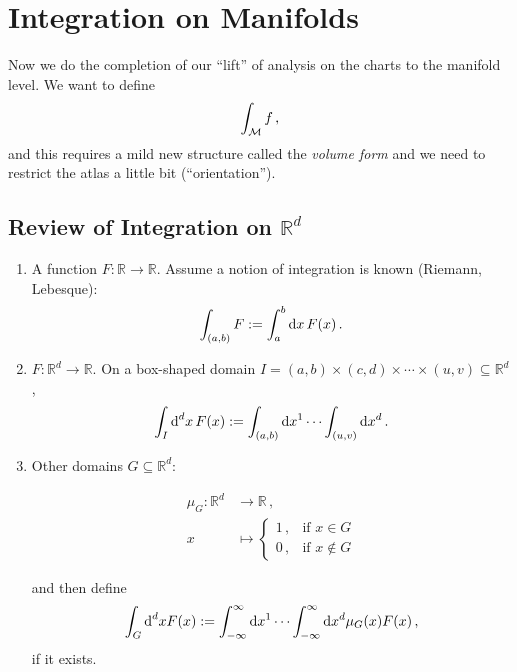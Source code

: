 \section{Integration on Manifolds}
Now we do the completion of our ``lift'' of analysis on the charts to the manifold level.
We want to define
\begin{equation}
    \int_{\mathcal{M}} f\,,
\end{equation}
and this requires a mild new structure called the \textit{volume form}
and we need to restrict the atlas a little bit (``orientation'').

\subsection[Review of Integration]{Review of Integration on $\mathbb{R}^d$}
\begin{enumerate}
    \item A function $F: \mathbb{R} \to \mathbb{R}$. Assume a notion of integration is known
        (Riemann, Lebesque):
        \begin{equation}
            \int_{(a,b)}F := \int_a^b \operatorname{d\!} x\, F(x)\,.
        \end{equation}
    \item $F: \mathbb{R}^d \to \mathbb{R}$.
        On a box-shaped domain
        $I = (a,b)\times(c,d)\times\cdots\times (u,v) \subseteq \mathbb{R}^d$,
        \begin{equation}
            \int_{I} \operatorname{d}^d\! x\, F(x) := \int_{(a,b)}\operatorname{d\!} x^1 \cdots \int_{(u,v)}\operatorname{d\!} x^d\,.
        \end{equation}
    \item Other domains $G\subseteq \mathbb{R}^d$:
        \begin{defn}
            \begin{align}
                \nonumber \mu_G: \mathbb{R}^d &\to \mathbb{R}\,,\\
                x&\mapsto
                \begin{cases}
                    1\,, & \text{if } x\in G\\
                    0\,, & \text{if } x\not\in G
                \end{cases}
            \end{align}
        \end{defn}
        and then define
        \begin{equation}
            \int_G \operatorname{d}^d\! x F(x):= \int_{-\infty}^\infty \operatorname{d\!} x^1 \cdots \int_{-\infty}^\infty \operatorname{d\!} x^d \mu_G(x) F(x)\,,
        \end{equation}
        if it exists.
\end{enumerate}

